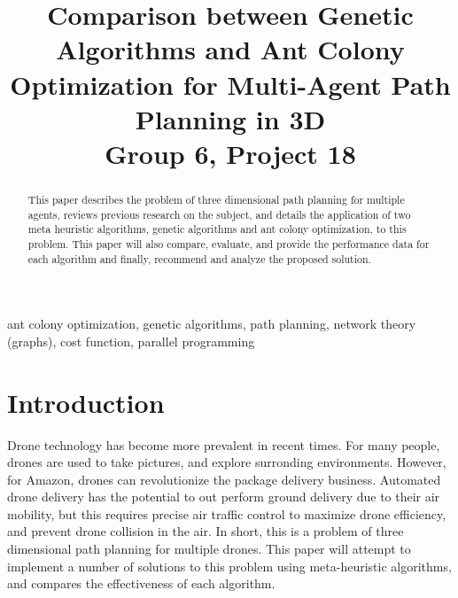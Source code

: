 \documentclass[conference]{IEEEtran}
\begin{document}
\title{Comparison between Genetic Algorithms and Ant Colony Optimization for Multi-Agent Path Planning in 3D \\
{\footnotesize Group 6, Project 18}}

\author{
\and
{}
\and
{}
\and
{}
\and
{}
\and
{}
}

\maketitle

\begin{abstract}
This paper describes the problem of three dimensional path planning for multiple agents, reviews previous research on the subject, and details the application of two meta heuristic algorithms, genetic algorithms and ant colony optimization, to this problem. This paper will also compare, evaluate, and provide the performance data for each algorithm and finally, recommend and analyze the proposed solution.
\end{abstract}

\begin{IEEEkeywords}
ant colony optimization, genetic algorithms, path planning, network theory (graphs), cost function, parallel programming
\end{IEEEkeywords}

\section{Introduction}
Drone technology has become more prevalent in recent times. For many people, drones are used to take pictures, and explore surronding environments. However, for Amazon, drones can revolutionize the package delivery business. Automated drone delivery has the potential to out perform ground delivery due to their air mobility, but this requires precise air traffic control to maximize drone efficiency, and prevent drone collision in the air. In short, this is a problem of three dimensional path planning for multiple drones. This paper will attempt to implement a number of solutions to this problem using meta-heuristic algorithms, and compares the effectiveness of each algorithm.
\end{document}
